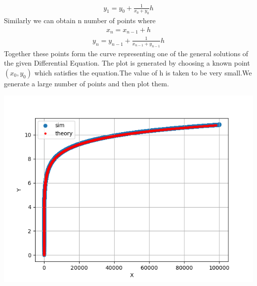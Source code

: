\documentclass[journal]{IEEEtran}
\begin{document}
\begin{align}  
y_1=y_0+{\frac{1}{x_0+y_0}}h
\end{align}
Similarly we can obtain n number of points where 
\begin{align}
    x_n=x_{n-1}+h 
\end{align}
\begin{align}
    y_n=y_{n-1}+{\frac{1}{x_{n-1}+y_{n-1}}}h
\end{align}
 Together these points form the curve representing one of the general solutions of the given Differential Equation. The plot is generated by choosing a known point $(x_0, y_0)$ which satisfies the equation.The value of h is taken to be very small.We generate a large number of points and then plot them.
\begin{center}
    \includegraphics[width=0.75\columnwidth]{figs/fig.png}
\end{center}
\end{document}
